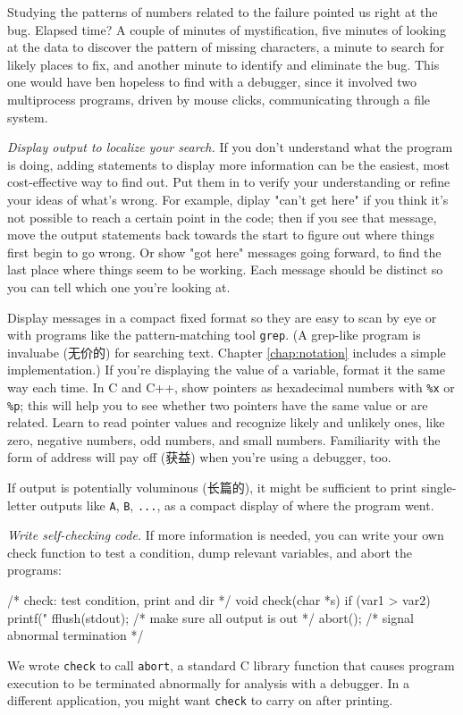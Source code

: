 Studying the patterns of numbers related to the failure pointed us right at
the bug. Elapsed time? A couple of minutes of mystification, five minutes
of looking at the data to discover the pattern of missing characters, a
minute to search for likely places to fix, and another minute to identify
and eliminate the bug. This one would have ben hopeless to find with a
debugger, since it involved two multiprocess programs, driven by mouse
clicks, communicating through a file system.

\emph{Display output to localize your search.} If you don't understand what
the program is doing, adding statements to display more information can be
the easiest, most cost-effective way to find out. Put them in to verify
your understanding or refine your ideas of what's wrong. For example,
diplay "can't get here" if you think it's not possible to reach a certain
point in the code; then if you see that message, move the output statements
back towards the start to figure out where things first begin to go wrong.
Or show "got here" messages going forward, to find the last place where
things seem to be working. Each message should be distinct so you can tell
which one you're looking at.

Display messages in a compact fixed format so they are easy to scan by eye
or with programs like the pattern-matching tool \verb'grep'. (A grep-like
program is invaluabe (无价的) for searching text. Chapter
\ref{chap:notation} includes a simple implementation.) If you're displaying
the value of a variable, format it the same way each time. In C and C++,
show pointers as hexadecimal numbers with \verb'%x' or \verb'%p'; this will
help you to see whether two pointers have the same value or are related.
Learn to read pointer values and recognize likely and unlikely ones, like
zero, negative numbers, odd numbers, and small numbers. Familiarity with
the form of address will pay off (获益) when you're using a debugger, too.

If output is potentially voluminous (长篇的), it might be sufficient to
print single-letter outputs like \verb'A', \verb'B', \verb'...', as a
compact display of where the program went.

\emph{Write self-checking code.} If more information is needed, you can
write your own check function to test a condition, dump relevant variables,
and abort the programs:
\begin{wellcode}
    /* check: test condition, print and dir */
    void check(char *s)
    {
        if (var1 > var2) {
            printf("%
            fflush(stdout); /* make sure all output is out */
            abort();        /* signal abnormal termination */
        }
    }
\end{wellcode}
We wrote \verb'check' to call \verb'abort', a standard C library function
that causes program execution to be terminated abnormally for analysis with
a debugger. In a different application, you might want \verb'check' to
carry on after printing.


